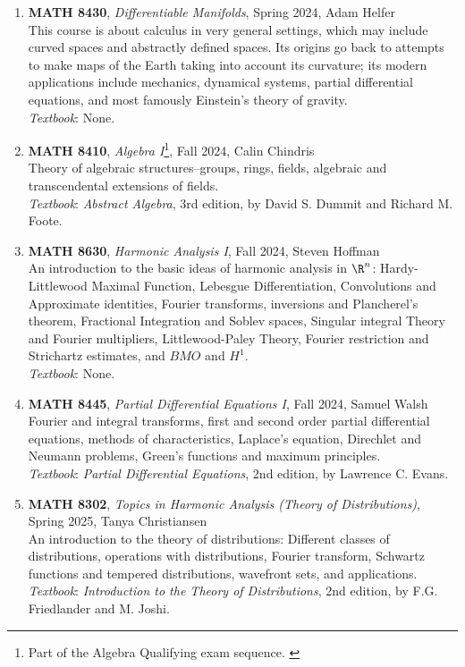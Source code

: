 \documentclass{article}
\begin{document}
\begin{enumerate}[leftmargin=0in]
    \item[] \textbf{MATH 8430}, \textit{Differentiable Manifolds}, Spring 2024, Adam Helfer\\
    This course is about calculus in very general settings, which may include curved spaces and abstractly defined spaces. Its origins go back to attempts to make maps of the Earth taking into account its curvature; its modern applications include mechanics, dynamical systems, partial differential equations, and most famously Einstein's theory of gravity. \\
    \textit{Textbook}: None. 

    \item[] \textbf{MATH 8410}, \textit{Algebra I}\footnote{Part of the Algebra Qualifying exam sequence. \label{Algebra Qual}}, Fall 2024, Calin Chindris\\
    Theory of algebraic structures--groups, rings, fields, algebraic and transcendental extensions of fields. \\
    \textit{Textbook}: \textit{Abstract Algebra}, 3rd edition, by David S. Dummit and Richard M. Foote. 
    
    \item[] \textbf{MATH 8630}, \textit{Harmonic Analysis I}, Fall 2024, Steven Hoffman \\
    An introduction to the basic ideas of harmonic analysis in $\R^n$: Hardy-Littlewood Maximal Function, Lebesgue Differentiation, Convolutions and Approximate identities, Fourier transforms, inversions and Plancherel's theorem, Fractional Integration and Soblev spaces, Singular integral Theory and Fourier multipliers, Littlewood-Paley Theory, Fourier restriction and Strichartz estimates, and $BMO$ and $H^1$.\\
    \textit{Textbook}: None.  

    \item[] \textbf{MATH 8445}, \textit{Partial Differential Equations I}, Fall 2024, Samuel Walsh\\
    Fourier and integral transforms, first and second order partial differential equations, methods of characteristics, Laplace's equation, Direchlet and Neumann problems, Green's functions and maximum principles. \\
    \textit{Textbook}: \textit{Partial Differential Equations}, 2nd edition, by Lawrence C. Evans. 

    \item[] \textbf{MATH 8302}, \textit{Topics in Harmonic Analysis (Theory of Distributions)}, Spring 2025, Tanya Christiansen\\
    An introduction to the theory of distributions: Different classes of distributions, operations with distributions, Fourier transform, Schwartz functions and tempered distributions, wavefront sets, and applications. \\
    \textit{Textbook}: \textit{Introduction to the Theory of Distributions}, 2nd edition, by F.G. Friedlander and M. Joshi.
    

\end{enumerate}
\end{document}
